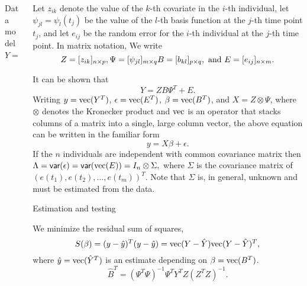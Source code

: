 \documentclass[final,plain]{beamer}
\newcommand{\vect}{\hbox{vec}}
\newcommand{\V}{\hbox{\sffamily var}}
\newlength{\onecolwid}
\begin{document}
\begin{frame}[t]
\begin{columns}[t]
\begin{column}{\onecolwid}
\begin{block}{Data model}
         $$Y = [y_{ij}]_{n {\times} m}. $$ 


         
      \end{block}
    \end{column}

    \begin{column}{\onecolwid}

      \begin{block}{}
         Let $z_{ik}$ denote the
         value of the $k$-th covariate in the $i$-th individual, let
         $\psi_{jl}=\psi_l(t_j)$ be the value of the $l$-th basis
         function at the $j$-th time point $t_j$, and let $e_{ij}$ be
         the random error for the $i$-th individual at the $j$-th time
         point. In matrix notation, We write
         $$Z=[z_{ik}]_{n {\times} p}, \Psi=[\psi_{jl}]_{m {\times}q}
         B=[b_{kl}]_{p {\times} q}, \hbox{ and } E=[e_{ij}]_{n
           {\times} m}.$$

         It can be shown that
         \begin{equation}
          Y = ZB\Psi^T + E.
        \end{equation}
        Writing $y=\vect(Y^T)$, $\epsilon=\vect(E^T)$, $\beta =
        \vect(B^T)$, and $X = Z \otimes \Psi$, where $\otimes$ denotes
        the Kronecker product and $\vect$ is an operator that stacks
        columns of a matrix into a single, large column vector, the
        above equation can be written in the familiar form $$y=X\beta
        + \epsilon.$$ If the $n$ individuals are independent with
        common covariance matrix then $\Lambda = \V(\epsilon) =
        \V(\vect({E})) = I_n \otimes \Sigma,$ where $\Sigma$ is the
        covariance matrix of $(e(t_1), e(t_2), \ldots, e(t_m))^T$.
        Note that $\Sigma$ is, in general, unknown and must be
        estimated from the data.
      \end{block}
  \begin{block}{Estimation and testing}

    We minimize the residual sum of squares,
    \begin{equation*}
      \label{eq:resid}
      S(\beta) = (y-\hat{y})^T(y-\hat{y}) = 
      \vect(Y-\hat{Y})\vect(Y-\hat{Y})^T,\nonumber
    \end{equation*}
    where $\hat{y}=\vect(\hat{Y}^T)$ is an estimate depending on $\beta =
    \vect(B^T)$.
    \begin{equation}
      \hat{B}^T = (\Psi^T\Psi)^{-1}\Psi^TY^TZ(Z^TZ)^{-1}. \label{eq:estim}
    \end{equation}
    

\end{block}
\end{column}
\end{columns}
\end{frame}
\end{document}
